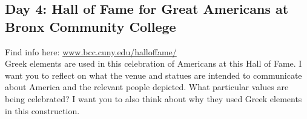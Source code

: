 \documentclass{article}
\begin{document}
\subsection*{Day  4: Hall  of  Fame  for  Great  Americans  at  Bronx  Community  College}

Find  info here:  \url{www.bcc.cuny.edu/halloffame/}\\ 

Greek  elements  are  used  in  this  celebration  of  Americans at this Hall of Fame.  I  want  you  to  reflect  on  what  the  venue  and  statues  are  intended  to  communicate  about  America  and  the  relevant  people  depicted.  What  particular  values  are  being  celebrated?  I  want  you  to  also  think  about  why  they  used  Greek  elements  in  this  construction.    

  
\end{document}

